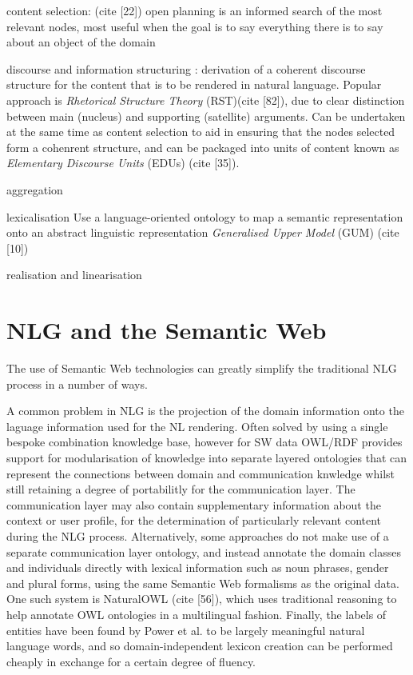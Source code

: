 \documentclass{acm_proc_article-sp}
\begin{document}
content selection: (cite [22]) open planning is an informed search of the most relevant nodes, most useful when the goal is to say everything there is to say about an object of the domain

discourse and information structuring : derivation of a coherent discourse structure for the content that is to be rendered in natural language. Popular approach is \textit{Rhetorical Structure Theory} (RST)(cite [82]), due to clear distinction between main (nucleus) and supporting (satellite) arguments. Can be undertaken at the same time as content selection to aid in ensuring that the nodes selected form a cohenrent structure, and can be packaged into units of content known as \textit{Elementary Discourse Units} (EDUs) (cite [35]).

aggregation

lexicalisation Use a language-oriented ontology to map a semantic representation onto an abstract linguistic representation \textit{Generalised Upper Model} (GUM) (cite [10])

realisation and linearisation 

\section{NLG and the Semantic Web}
The use of Semantic Web technologies can greatly simplify the traditional NLG process in a number of ways.

A common problem in NLG is the projection of the domain information onto the laguage information used for the NL rendering. Often solved by using a single bespoke combination knowledge base, however for SW data OWL/RDF provides support for modularisation of knowledge into separate layered ontologies that can represent the connections between domain and communication knwledge whilst still retaining a degree of portabilitly for the communication layer. The communication layer may also contain supplementary information about the context or user profile, for the determination of particularly relevant content during the NLG process.
Alternatively, some approaches do not make use of a separate communication layer ontology, and instead annotate the domain classes and individuals directly with lexical information such as noun phrases, gender and plural forms, using the same Semantic Web formalisms as the original data. One such system is NaturalOWL (cite [56]), which uses traditional reasoning to help annotate OWL ontologies in a multilingual fashion.
Finally, the labels of entities have been found by Power et al. \cite{105} to be largely meaningful natural language words, and so domain-independent lexicon creation can be performed cheaply in exchange for a certain degree of fluency.
\end{document}
